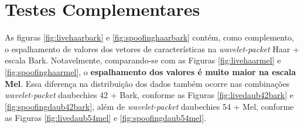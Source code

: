 	\section{Testes Complementares}
	\label{chap:testsResults:sec:Experimento05}
		As figuras \ref{fig:livehaarbark} e \ref{fig:spoofinghaarbark} contém, como complemento, o espalhamento de valores dos vetores de características na \textit{wavelet-packet} Haar + escala Bark. Notavelmente, comparando-se com as Figuras \ref{fig:livehaarmel} e \ref{fig:spoofinghaarmel}, o \textbf{espalhamento dos valores é muito maior na escala \textbf{Mel}}. Essa diferença na distribuição dos dados também ocorre nas combinações \textit{wavelet-packet} daubechies 42 + Bark, conforme as Figuras \ref{fig:livedaub42bark} e \ref{fig:spoofingdaub42bark}, além de \textit{wavelet-packet} daubechies 54 + Mel, conforme as Figuras \ref{fig:livedaub54mel} e \ref{fig:spoofingdaub54mel}.
		
